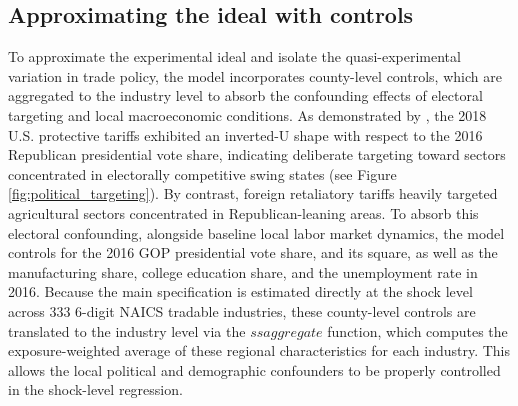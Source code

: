 \documentclass[12pt]{article}
\numberwithin{figure}{section}
\numberwithin{table}{section}
\begin{document}
\subsection{Approximating the ideal with controls}

To approximate the experimental ideal and isolate the quasi-experimental variation in trade policy, the model incorporates county-level controls, which are aggregated to the industry level to absorb the confounding effects of electoral targeting and local macroeconomic conditions. As demonstrated by \cite{Fajgelbaum2020}, the 2018 U.S. protective tariffs exhibited an inverted-U shape with respect to the 2016 Republican presidential vote share, indicating deliberate targeting toward sectors concentrated in electorally competitive swing states (see Figure \ref{fig:political_targeting}). By contrast, foreign retaliatory tariffs heavily targeted agricultural sectors concentrated in Republican-leaning areas. To absorb this electoral confounding, alongside baseline local labor market dynamics, the model controls for the 2016 GOP presidential vote share, and its square, as well as the manufacturing share, college education share, and the unemployment rate in 2016. Because the main specification is estimated directly at the shock level across $333$ 6-digit NAICS tradable industries, these county-level controls are translated to the industry level via the $ssaggregate$ function, which computes the exposure-weighted average of these regional characteristics for each industry. This allows the local political and demographic confounders to be properly controlled in the shock-level regression.
\end{document}
